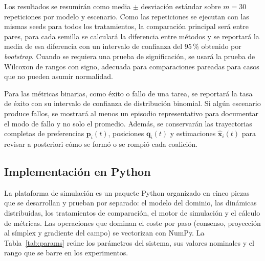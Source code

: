 Los resultados se resumirán como media $\pm$ desviación estándar sobre $m = 30$
repeticiones por modelo y escenario. Como las repeticiones se ejecutan con las
mismas seeds para todos los tratamientos, la comparación principal será entre pares,
para cada semilla se calculará la diferencia entre métodos y se reportará la media de
esa diferencia con un intervalo de confianza del 95\,\% obtenido por
\emph{bootstrap}. Cuando se requiera una prueba de significación, se usará la prueba
de Wilcoxon de rangos con signo, adecuada para comparaciones pareadas para casos que no pueden asumir
normalidad.

Para las métricas binarias, como éxito o fallo de una tarea, se reportará la tasa de
éxito con su intervalo de confianza de distribución binomial. Si algún escenario produce fallos, se
mostrará al menos un episodio representativo para documentar el modo de fallo y no
solo el promedio. Además, se conservarán las trayectorias completas de preferencias
$\mathbf{p}_i(t)$, posiciones $\mathbf{q}_i(t)$ y estimaciones
$\hat{\mathbf{x}}_i(t)$ para revisar a posteriori cómo se formó o se rompió cada
coalición.

\subsection{Implementación en Python}

La plataforma de simulación es un paquete Python organizado en cinco piezas que se
desarrollan y prueban por separado: el modelo del dominio, las dinámicas distribuidas,
los tratamientos de comparación, el motor de simulación y el cálculo de métricas. Las
operaciones que dominan el coste por paso (consenso, proyección al símplex y gradiente
del campo) se vectorizan con NumPy. La Tabla~\ref{tab:params} reúne los parámetros del
sistema, sus valores nominales y el rango que se barre en los experimentos.

